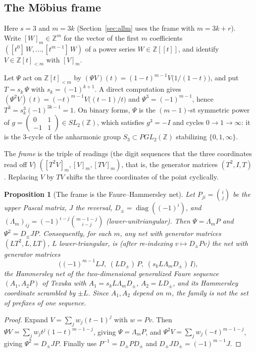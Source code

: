 \documentclass[11pt]{amsart}
\newtheorem{proposition}[theorem]{Proposition}
\theoremstyle{definition}
\theoremstyle{plain}
\newcommand{\Z}{\mathbb{Z}}
\newcommand{\coef}[1]{[t^{#1}]\,}
\begin{document}
\subsection{The M\"obius frame}
Here $s=3$ and $m=3k$ (Section~\ref{sec:allm} uses the frame with $m=3k+r$). Write $[W]_m\in\Z^m$ for the vector of the first $m$ coefficients $(\coef{0}W,\dots,\coef{m-1}W)$ of a power series $W\in\Z[[t]]$, and identify $V\in\Z[t]_{<m}$ with $[V]_m$.

Let $\Psi$ act on $\Z[t]_{<m}$ by $(\Psi V)(t)=(1-t)^{m-1}V\bigl(1/(1-t)\bigr)$, and put $T=s_k\,\Psi$ with $s_k=(-1)^{k+1}$. A direct computation gives $(\Psi^2V)(t)=(-t)^{m-1}V\bigl((t-1)/t\bigr)$ and $\Psi^3=(-1)^{m-1}$, hence $T^3=s_k^3(-1)^{3k-1}=1$. On binary forms, $\Psi$ is the $(m-1)$-st symmetric power of $g=\left(\begin{smallmatrix}0&1\\-1&1\end{smallmatrix}\right)\in SL_2(\Z)$, which satisfies $g^3=-I$ and cycles $0\to1\to\infty$: it is the 3-cycle of the anharmonic group $S_3\subset PGL_2(\Z)$ stabilizing $\{0,1,\infty\}$.

The \emph{frame} is the triple of readings (the digit sequences that the three coordinates read off $V$) $([T^2V]_m,[V]_m,[TV]_m)$, that is, the generator matrices $(T^2,I,T)$. Replacing $V$ by $TV$ shifts the three coordinates of the point cyclically.

\begin{proposition}[The frame is the Faure--Hammersley net]\label{prop:faure}
Let $P_{ji}=\binom{i}{j}$ be the upper Pascal matrix, $J$ the reversal, $D_{\pm}=\operatorname{diag}((-1)^i)$, and $(\Lambda_m)_{ij}=(-1)^{i-j}\binom{m-1-j}{i-j}$ (lower-unitriangular). Then $\Psi=\Lambda_m P$ and $\Psi^2=D_{\pm}JP$. Consequently, for each $m$, any net with generator matrices $(LT^2,L,LT)$, $L$ lower-triangular, is (after re-indexing $v\mapsto D_{\pm}Pv$) the net with generator matrices
\[
\bigl((-1)^{m-1}LJ,\; (LD_{\pm})\,P,\; (s_kL\Lambda_m D_{\pm})\,I\bigr),
\]
the Hammersley net of the two-dimensional generalized Faure sequence $(A_1,A_2P)$ of Tezuka \cite{Tez95} with $A_1=s_kL\Lambda_m D_{\pm}$, $A_2=LD_{\pm}$, and its Hammersley coordinate scrambled by $\pm L$. Since $A_1,A_2$ depend on $m$, the family is not the set of prefixes of one sequence.
\end{proposition}

\begin{proof}
Expand $V=\sum_j w_j(t-1)^j$ with $w=Pv$. Then $\Psi V=\sum_j w_j t^j(1-t)^{m-1-j}$, giving $\Psi=\Lambda_m P$, and $\Psi^2 V=\sum_j w_j(-t)^{m-1-j}$, giving $\Psi^2=D_{\pm}JP$. Finally use $P^{-1}=D_{\pm}PD_{\pm}$ and $D_{\pm}JD_{\pm}=(-1)^{m-1}J$.
\end{proof}
\end{document}
